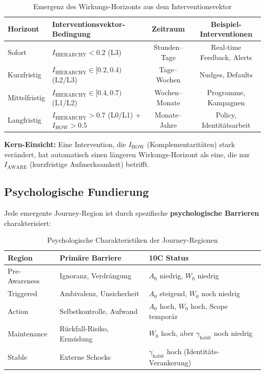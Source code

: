 \begin{table}[htbp]
\centering
\caption{Emergenz des Wirkungs-Horizonts aus dem Interventionsvektor}
\label{tab:18-horizon-emergence}
\renewcommand{\arraystretch}{1.4}
\small
\begin{tabular}{@{}llcc@{}}
\toprule
\textbf{Horizont} & \textbf{Interventionsvektor-Bedingung} & \textbf{Zeitraum} & \textbf{Beispiel-Interventionen} \\
\midrule
Sofort & $I_{\text{HIERARCHY}} < 0.2$ (L3) & Stunden--Tage & Real-time Feedback, Alerts \\
Kurzfristig & $I_{\text{HIERARCHY}} \in [0.2, 0.4)$ (L2/L3) & Tage--Wochen & Nudges, Defaults \\
Mittelfristig & $I_{\text{HIERARCHY}} \in [0.4, 0.7)$ (L1/L2) & Wochen--Monate & Programme, Kampagnen \\
Langfristig & $I_{\text{HIERARCHY}} > 0.7$ (L0/L1) + $I_{\text{HOW}} > 0.5$ & Monate--Jahre & Policy, Identitätsarbeit \\
\bottomrule
\end{tabular}
\end{table}

\textbf{Kern-Einsicht:} Eine Intervention, die $I_{\text{HOW}}$ (Komplementaritäten) stark verändert, hat automatisch einen längeren Wirkungs-Horizont als eine, die nur $I_{\text{AWARE}}$ (kurzfristige Aufmerksamkeit) betrifft.

\subsection{Psychologische Fundierung}

Jede emergente Journey-Region ist durch spezifische \textbf{psychologische Barrieren} charakterisiert:

\begin{table}[htbp]
\centering
\caption{Psychologische Charakteristiken der Journey-Regionen}
\label{tab:18-phase-psychology}
\renewcommand{\arraystretch}{1.4}
\small
\begin{tabular}{@{}lll@{}}
\toprule
\textbf{Region} & \textbf{Primäre Barriere} & \textbf{10C Status} \\
\midrule
Pre-Awareness & Ignoranz, Verdrängung & $A_0$ niedrig, $W_0$ niedrig \\
Triggered & Ambivalenz, Unsicherheit & $A_0$ steigend, $W_0$ noch niedrig \\
Action & Selbstkontrolle, Aufwand & $A_0$ hoch, $W_0$ hoch, Scope temporär \\
Maintenance & Rückfall-Risiko, Ermüdung & $W_0$ hoch, aber $\gamma_{\text{habit}}$ noch niedrig \\
Stable & Externe Schocks & $\gamma_{\text{habit}}$ hoch (Identitäts-Verankerung) \\
\bottomrule
\end{tabular}
\end{table}

